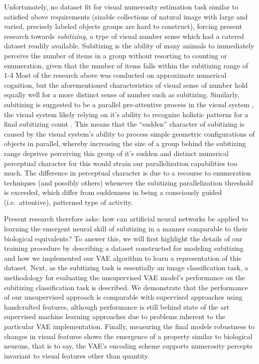 \documentclass[twocolumn]{article}
\begin{document}
Unfortunately, no dataset fit for visual numerosity estimation task
similar to \citet{stoianov2012} satisfied above requirements (sizable
collections of natural image with large and varied, precisely labeled
objects groups are hard to construct), forcing present research towards
\emph{subitizing}, a type of visual number sense which had a catered
dataset readily available. Subitizing is the ability of many animals to
immediately perceive the number of items in a group without resorting to
counting or enumeration, given that the number of items falls within the
subitizing range of 1-4 \citep{kaufman1949, animalsnumericalcognition}
Most of the research above was conducted on approximate numerical
cognition, but the aforementioned characteristics of visual sense of
number hold equally well for a more distinct sense of number such as
subitizing. Similarly, subitizing is suggested to be a parallel
pre-attentive process in the visual system
\citep[p.~57]{dehaene2011number}, the visual system likely relying on
it's ability to recognize holistic patterns for a final subitizing count
\citetext{\citealp{jansen2014role}; \citealp[p.~57]{dehaene2011number}; \citealp{piazza2002subitizing}}.
This means that the ``sudden'' character of subitizing is caused by the
visual system's ability to process simple geometric configurations of
objects in parallel, whereby increasing the size of a group behind the
subitizing range deprives perceiving this group of it's sudden and
distinct numerical perceptual character for this would strain our
parallelization capabilities too much. The difference in perceptual
character is due to a recourse to enumeration techniques (and possibly
others) whenever the subitizing parallelization threshold is exceeded,
which differ from suddenness in being a consciously guided
(i.e.~attentive), patterned type of activity.

Present research therefore asks: how can artificial neural networks be
applied to learning the emergent neural skill of subitizing in a manner
comparable to their biological equivalents? To answer this, we will
first highlight the details of our training procedure by describing a
dataset constructed for modeling subitizing and how we implemented our
VAE algorithm to learn a representation of this dataset. Next, as the
subitizing task is essentially an image classification task, a
methodology for evaluating the unsupervised VAE model's performance on
the subitizing classification task is described. We demonstrate that the
performance of our unsupervised approach is comparable with supervised
approaches using handcrafted features, although performance is still
behind state of the art supervised machine learning approaches due to
problems inherent to the particular VAE implementation. Finally,
measuring the final models robustness to changes in visual features
shows the emergence of a property similar to biological neurons, that is
to say, the VAE's encoding scheme supports numerosity
percepts invariant to visual features other than quantity.
\end{document}
